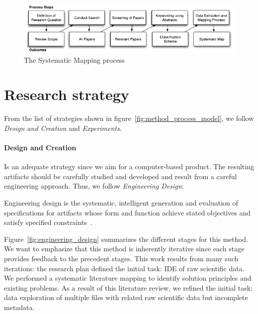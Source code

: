 \begin{figure}[htbp]
    \centering
    \includegraphics{images/3_mapping/systematicmapping_diagram}
    \caption{The Systematic Mapping process}
    \label{fig:systematicmapping_diagram}
\end{figure}

\section{Research strategy}
\label{sec:method_strategy}
From the list of strategies shown in figure~\ref{fig:method_process_model},
we follow \emph{Design and Creation} and \emph{Experiments}.

\paragraph{Design and Creation} Is an adequate strategy since we aim for a
computer-based product. The resulting artifacts should be carefully studied
and developed and result from a careful engineering approach.
Thus, we follow \emph{Engineering Design}:
    
\begin{displayquote}
  Engineering design is the systematic, intelligent generation and evaluation
  of specifications for artifacts whose form and function achieve stated
  objectives and satisfy specified constraints~\cite{Dym2012}.
\end{displayquote}

Figure~\ref{fig:engineering_design} summarizes the different stages for this method.
We want to emphasize that this method is inherently iterative since each stage
provides feedback to the precedent stages. This work results from many such
iterations: the research plan defined the initial task: \gls{IDE} of raw scientific data.
We performed a systematic literature mapping to identify solution principles and existing problems.
As a result of this literature review, we refined the initial task: data exploration of multiple files with related raw scientific data but incomplete metadata.


